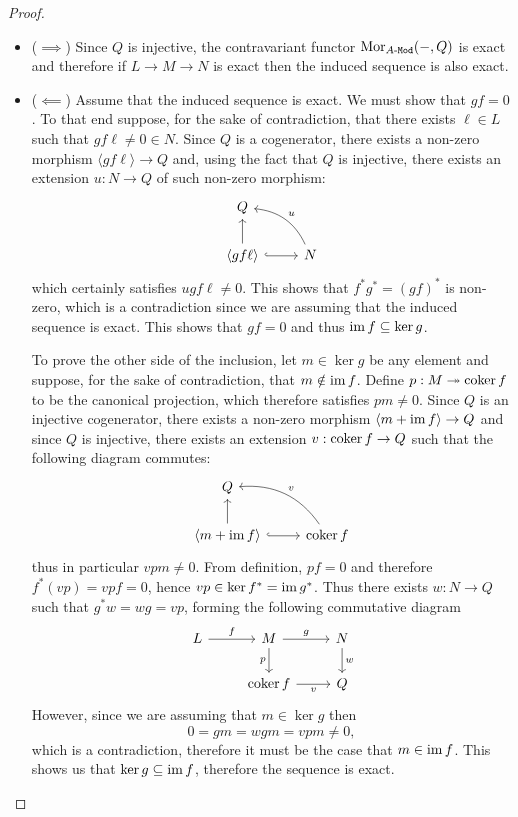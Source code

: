 \begin{proof}
\begin{itemize}\setlength\itemsep{0em}
\item (\(\implies\)) Since \(Q\) is injective, the contravariant functor
  \(\operatorname{Mor}_{{A\text{-}\texttt{Mod}}}(-, Q)\) is exact and therefore if \(L \to M \to N\) is exact then
  the induced sequence is also exact.

\item (\(\impliedby\)) Assume that the induced sequence is exact. We must show
  that \(g f = 0\). To that end suppose, for the sake of contradiction, that
  there exists \(\ell \in L\) such that \(g f \ell \neq 0 \in N\). Since \(Q\) is a
  cogenerator, there exists a non-zero morphism \(\langle g f \ell \rangle \to Q\) and, using the
  fact that \(Q\) is injective, there exists an extension \(u: N \to Q\) of such
  non-zero morphism:
  \[
  \begin{tikzcd}
  Q & \\
  \langle g f \ell \rangle \ar[r, hook] \ar[u]
  &N \ar[lu, bend right, "u"']
  \end{tikzcd}
  \]
  which certainly satisfies \(u g f \ell \neq 0\). This shows that
  \(f^{*} g^{*} = (g f)^{*}\) is non-zero, which is a contradiction since we are
  assuming that the induced sequence is exact. This shows that \(g f = 0\) and
  thus \(\operatorname{im} f \subseteq \ker g\).

  To prove the other side of the inclusion, let \(m \in \ker g\) be any element
  and suppose, for the sake of contradiction, that \(m \notin \operatorname{im} f\). Define \(p: M
  \twoheadrightarrow \operatorname{coker} f\) to be the canonical projection, which therefore satisfies \(p
  m \neq 0\). Since \(Q\) is an injective cogenerator, there exists a non-zero morphism
  \(\langle m + \operatorname{im} f \rangle \to Q\) and since \(Q\) is injective, there exists an extension
  \(v: \operatorname{coker} f \to Q\) such that the following diagram commutes:
  \[
  \begin{tikzcd}
  Q & \\
  \langle m + \im f \rangle \ar[r, hook] \ar[u]
  &\coker f \ar[lu, bend right, "v"']
  \end{tikzcd}
  \]
  thus in particular \(v p m \neq 0\). From definition, \(p f = 0\) and therefore
  \(f^{*}(v p) = v p f = 0\), hence \(v p \in \ker f^{*} = \operatorname{im} g^{*}\). Thus there
  exists \(w: N \to Q\) such that \(g^{*} w = w g = v p\), forming the following
  commutative diagram
  \[
  \begin{tikzcd}
  L \ar[r, "f"] &M \ar[r, "g"] \ar[d, "p"'] &N \ar[d, "w"] \\
  &\coker f \ar[r, "v"'] &Q
  \end{tikzcd}
  \]
  However, since we are assuming that \(m \in \ker g\) then
  \[
  0 = g m = w g m = v p m \neq 0,
  \]
  which is a contradiction, therefore it must be the case that \(m \in \operatorname{im}
  f\). This shows us that \(\ker g \subseteq \operatorname{im} f\), therefore the sequence is exact.
\end{itemize}
\end{proof}

